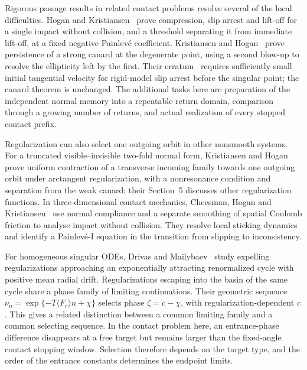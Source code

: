 Rigorous passage results in related contact problems resolve
several of the local difficulties. Hogan and
Kristiansen~\cite[Theorems~3.1--3.2]{HK2017} prove compression,
slip arrest and lift-off for a single impact without collision,
and a threshold separating it from immediate lift-off, at a fixed
negative Painlev\'e coefficient. Kristiansen and
Hogan~\cite[Theorem~6]{KH2018} prove persistence of a strong
canard at the degenerate point, using a second blow-up to resolve
the ellipticity left by the first. Their
erratum~\cite{KH2018Erratum} requires sufficiently small initial
tangential velocity for rigid-model slip arrest before the singular
point; the canard theorem is unchanged. The additional tasks here
are preparation of the independent normal memory into a repeatable
return domain, comparison through a growing number of returns,
and actual realization of every stopped contact prefix.

Regularization can also select one outgoing orbit in other
nonsmooth systems. For a truncated visible--invisible two-fold
normal form, Kristiansen and Hogan~\cite[Theorem~1]{KH2019TwoFold}
prove uniform contraction of a transverse incoming family towards
one outgoing orbit under arctangent regularization, with a
nonresonance condition and separation from the weak canard;
their Section~5 discusses other regularization functions.
In three-dimensional contact mechanics, Cheesman, Hogan and
Kristiansen~\cite[Sections~4--5]{CHK2023} use normal compliance
and a separate smoothing of spatial Coulomb friction to analyse
impact without collision. They resolve local sticking dynamics
and identify a Painlev\'e-I equation in the transition from
slipping to inconsistency.

For homogeneous singular ODEs, Drivas and
Mailybaev~\cite[Theorem~5 and Corollary~2]{DM2018} study expelling
regularizations approaching an exponentially attracting
renormalized cycle with positive mean radial drift.
Regularizations escaping into the basin of the same cycle share
a phase family of limiting continuations. Their geometric sequence
$\nu_n=\exp\{-T\langle F_r\rangle n+\chi\}$ selects phase
$\zeta=c-\chi$, with regularization-dependent $c$.
This gives a related distinction between a common limiting family
and a common selecting sequence. In the contact problem here, an
entrance-phase difference disappears at a free target but remains
larger than the fixed-angle contact stopping window. Selection
therefore depends on the target type, and the order of the entrance
constants determines the endpoint limits.

